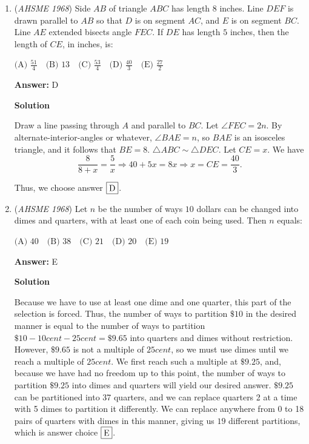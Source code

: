 \begin{enumerate}
\textbf{Solution}

Because we start with $x_1=-1$, and the terms $x_k$ alternate between $1$ and $-1$, there is either one more $-1$ than the number of $1$s (when $n$ is odd), or there are an equal number of $1$s and $-1$s (when $n$ is even). In the former case, $f(n)=\frac{-1}{n}$, and, in the latter case, $f(n)=0$. This is only consistent with answer $\fbox{C}$.

 


	\item (\textit{AHSME 1968}) Side $AB$ of triangle $ABC$ has length 8 inches. Line $DEF$ is drawn parallel to $AB$ so that $D$ is on segment $AC$, and $E$ is on segment $BC$. Line $AE$ extended bisects angle $FEC$. If $DE$ has length $5$ inches, then the length of $CE$, in inches, is:


 $\text{(A) } \frac{51}{4}\quad \text{(B) } 13\quad \text{(C) } \frac{53}{4}\quad \text{(D) } \frac{40}{3}\quad \text{(E) } \frac{27}{2}$

 \textbf{Answer: }D



\textbf{Solution}

Draw a line passing through $A$ and parallel to $BC$. Let $\angle FEC = 2n$. By alternate-interior-angles or whatever, $\angle BAE = n$, so $BAE$ is an isosceles triangle, and it follows that $BE = 8$. $\triangle ABC \sim \triangle DEC$. Let $CE = x$. We have
 \[\frac{8}{8+x} = \frac{5}{x} \Rightarrow 40+5x = 8x \Rightarrow x = CE =\boxed{\frac{40}{3}}.\]

 Thus, we choose answer $\fbox{D}$.

 


	\item (\textit{AHSME 1968}) Let $n$ be the number of ways $10$ dollars can be changed into dimes and quarters, with at least one of each coin being used. Then $n$ equals:


 $\text{(A) } 40\quad \text{(B) } 38\quad \text{(C) } 21\quad \text{(D) } 20\quad \text{(E) } 19$

 \textbf{Answer: }E



\textbf{Solution}

Because we have to use at least one dime and one quarter, this part of the selection is forced. Thus, the number of ways to partition $\$10$ in the desired manner is equal to the number of ways to partition $\$10-10cent-25cent=\$9.65$ into quarters and dimes without restriction. However, $\$9.65$ is not a multiple of $25cent$, so we must use dimes until we reach a multiple of $25cent$. We first reach such a multiple at $\$9.25$, and, because we have had no freedom up to this point, the number of ways to partition $\$9.25$ into dimes and quarters will yield our desired answer. $\$9.25$ can be partitioned into 37 quarters, and we can replace quarters 2 at a time with 5 dimes to partition it differently. We can replace anywhere from 0 to 18 pairs of quarters with dimes in this manner, giving us $\boxed{19}$ different partitions, which is answer choice $\fbox{E}$.


\end{enumerate}
